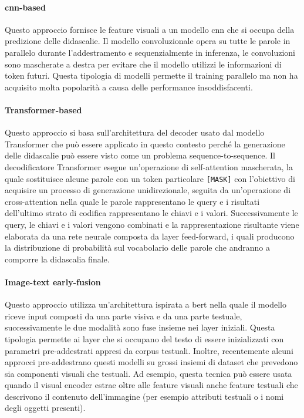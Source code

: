 \paragraph{\acrshort{cnn}-based}
Questo approccio fornisce le feature visuali a un modello \acrshort{cnn} che si occupa della predizione delle didascalie. Il modello convoluzionale opera su tutte le parole in parallelo durante l'addestramento e sequenzialmente in inferenza, le convoluzioni sono mascherate a destra per evitare che il modello utilizzi le informazioni di token futuri.
Questa tipologia di modelli permette il training parallelo ma non ha acquisito molta popolarità a causa delle performance insoddisfacenti.
\paragraph{Transformer-based}
Questo approccio si basa sull'architettura del decoder usato dal modello Transformer che può essere applicato in questo contesto perché la generazione delle didascalie può essere visto come un problema sequence-to-sequence.
Il decodificatore Transformer esegue un'operazione di self-attention mascherata, la quale sostituisce alcune parole con un token particolare \texttt{[MASK]} con l'obiettivo di acquisire un processo di generazione unidirezionale, seguita da un'operazione di cross-attention nella quale le parole rappresentano le query e i risultati dell'ultimo strato di codifica rappresentano le chiavi e i valori. Successivamente le query, le chiavi e i valori vengono combinati e la rappresentazione risultante viene elaborata da una rete neurale composta da layer feed-forward, i quali producono la distribuzione di probabilità sul vocabolario delle parole che andranno a comporre la didascalia finale.
\paragraph{Image-text early-fusion}
Questo approccio utilizza un'architettura ispirata a \acrshort{bert} \cite{devlin2018bert} nella quale il modello riceve input composti da una parte visiva e da una parte testuale, successivamente le due modalità sono fuse insieme nei layer iniziali. Questa tipologia permette ai layer che si occupano del testo di essere inizializzati con parametri pre-addestrati appresi da corpus testuali. Inoltre, recentemente alcuni approcci pre-addestrano questi modelli su grossi insiemi di dataset che prevedono sia componenti visuali che testuali. Ad esempio, questa tecnica può essere usata quando il visual encoder estrae oltre alle feature visuali anche feature testuali che descrivono il contenuto dell'immagine (per esempio attributi testuali o i nomi degli oggetti presenti).
